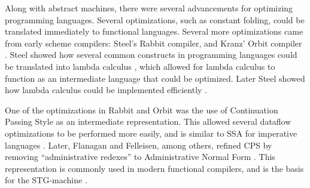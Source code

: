 Along with abstract machines, there were several advancements for optimizing programming languages.
Several optimizations, such as constant folding, could be translated immediately to functional languages.
Several more optimizations came from early scheme compilers: Steel's Rabbit compiler, and Kranz' Orbit compiler \cite{steele78,orbit}.
Steel showed how several common constructs in programming languages could be translated into lambda calculus 
\cite{ultimate_imperative, ultimate_declarative},
which allowed for lambda calculus to function as an intermediate language that could be optimized.
Later Steel showed how lambda calculus could be implemented efficiently \cite{ lambda_rename_steel, lambda_goto}.

One of the optimizations in Rabbit and Orbit was the use of Continuation Passing Style as an intermediate representation.
This allowed several dataflow optimizations to be performed more easily, and is similar to SSA 
for imperative languages \cite{continuations_appel}.
Later, Flanagan and Felleisen, among others, refined CPS by removing ``administrative redexes'' to Administrative Normal Form
\cite{anormal_Flanagan}.
This representation is commonly used in modern functional compilers, and is the basis for the STG-machine \cite{stg-peytonJones}.

